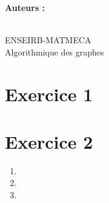 \documentclass[a4paper,12pt]{article}
\title{\texteTitre}
\author{\texteAuteurs}
\date{\texteDate}
\begin{document}


\hypersetup{pageanchor=false}
\begin{titlepage}
    \centering

    \vspace*{1.5cm}

    {\Huge\bfseries \texteNumero\par}

    \vspace{0.8cm}

    {\LARGE \texteTitre \par}

    \vspace{7cm}

    {\Large
    \textbf{Auteurs :}\\
    \texteAuteurs\par}

    \vfill

    {\large
    \texteDate\\
    ENSEIRB-MATMECA\\
    Algorithmique des graphes
    \par}

    \vspace{1cm}

\end{titlepage}
\hypersetup{pageanchor=true} %


\section{Exercice 1}

\newpage
\section{Exercice 2}
\begin{enumerate}
    \item 

    \item 

    \item


\end{enumerate}
\end{document}
